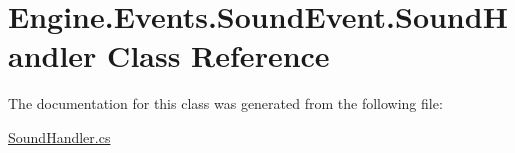 \hypertarget{a00394}{}\section{Engine.\+Events.\+Sound\+Event.\+Sound\+Handler Class Reference}
\label{a00394}


The documentation for this class was generated from the following file\+:\begin{DoxyCompactItemize}
\item 
\hyperlink{a00077}{Sound\+Handler.\+cs}\end{DoxyCompactItemize}
